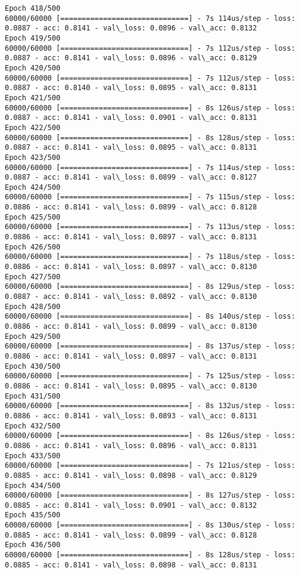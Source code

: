 \documentclass[11pt]{article}
\begin{document}
\begin{Verbatim}[commandchars=\\\{\}]
Epoch 418/500
60000/60000 [==============================] - 7s 114us/step - loss: 0.0887 - acc: 0.8141 - val\_loss: 0.0896 - val\_acc: 0.8132
Epoch 419/500
60000/60000 [==============================] - 7s 112us/step - loss: 0.0887 - acc: 0.8141 - val\_loss: 0.0896 - val\_acc: 0.8129
Epoch 420/500
60000/60000 [==============================] - 7s 112us/step - loss: 0.0887 - acc: 0.8140 - val\_loss: 0.0895 - val\_acc: 0.8131
Epoch 421/500
60000/60000 [==============================] - 8s 126us/step - loss: 0.0887 - acc: 0.8141 - val\_loss: 0.0901 - val\_acc: 0.8131
Epoch 422/500
60000/60000 [==============================] - 8s 128us/step - loss: 0.0887 - acc: 0.8141 - val\_loss: 0.0895 - val\_acc: 0.8131
Epoch 423/500
60000/60000 [==============================] - 7s 114us/step - loss: 0.0887 - acc: 0.8141 - val\_loss: 0.0899 - val\_acc: 0.8127
Epoch 424/500
60000/60000 [==============================] - 7s 115us/step - loss: 0.0886 - acc: 0.8141 - val\_loss: 0.0899 - val\_acc: 0.8128
Epoch 425/500
60000/60000 [==============================] - 7s 113us/step - loss: 0.0886 - acc: 0.8141 - val\_loss: 0.0897 - val\_acc: 0.8131
Epoch 426/500
60000/60000 [==============================] - 7s 118us/step - loss: 0.0886 - acc: 0.8141 - val\_loss: 0.0897 - val\_acc: 0.8130
Epoch 427/500
60000/60000 [==============================] - 8s 129us/step - loss: 0.0887 - acc: 0.8141 - val\_loss: 0.0892 - val\_acc: 0.8130
Epoch 428/500
60000/60000 [==============================] - 8s 140us/step - loss: 0.0886 - acc: 0.8141 - val\_loss: 0.0899 - val\_acc: 0.8130
Epoch 429/500
60000/60000 [==============================] - 8s 137us/step - loss: 0.0886 - acc: 0.8141 - val\_loss: 0.0897 - val\_acc: 0.8131
Epoch 430/500
60000/60000 [==============================] - 7s 125us/step - loss: 0.0886 - acc: 0.8141 - val\_loss: 0.0895 - val\_acc: 0.8130
Epoch 431/500
60000/60000 [==============================] - 8s 132us/step - loss: 0.0886 - acc: 0.8141 - val\_loss: 0.0893 - val\_acc: 0.8131
Epoch 432/500
60000/60000 [==============================] - 8s 126us/step - loss: 0.0886 - acc: 0.8141 - val\_loss: 0.0896 - val\_acc: 0.8131
Epoch 433/500
60000/60000 [==============================] - 7s 121us/step - loss: 0.0885 - acc: 0.8141 - val\_loss: 0.0898 - val\_acc: 0.8129
Epoch 434/500
60000/60000 [==============================] - 8s 127us/step - loss: 0.0885 - acc: 0.8141 - val\_loss: 0.0901 - val\_acc: 0.8132
Epoch 435/500
60000/60000 [==============================] - 8s 130us/step - loss: 0.0885 - acc: 0.8141 - val\_loss: 0.0899 - val\_acc: 0.8128
Epoch 436/500
60000/60000 [==============================] - 8s 128us/step - loss: 0.0885 - acc: 0.8141 - val\_loss: 0.0898 - val\_acc: 0.8131

\end{Verbatim}
\end{document}
